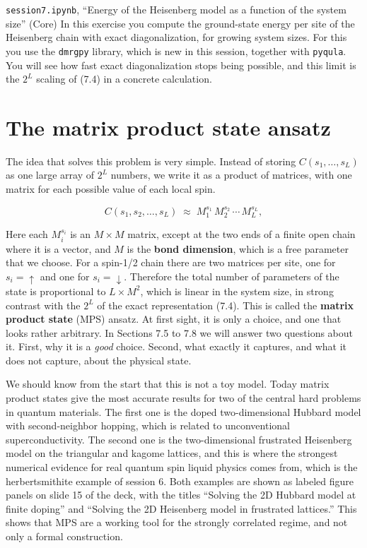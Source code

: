 \begin{notebookbox}{\texttt{session7.ipynb}, ``Energy of the Heisenberg model as a function of the system size'' (Core)}
In this exercise you compute the ground-state energy per site of the Heisenberg chain with exact
diagonalization, for growing system sizes. For this you use the \texttt{dmrgpy} library, which is new
in this session, together with
\texttt{pyqula}. You will see how fast exact diagonalization stops being possible, and this limit is
the $2^L$ scaling of (7.4) in a concrete calculation.
\end{notebookbox}

\section{The matrix product state ansatz}

The idea that solves this problem is very simple. Instead of storing $C(s_1,\dots,s_L)$ as one large
array of $2^L$ numbers, we write it as a product of matrices, with one matrix for each possible value
of each local spin.

\begin{equation}
C(s_1,s_2,\dots,s_L) \;\approx\; M^{s_1}_{1}\, M^{s_2}_{2}\, \cdots\, M^{s_L}_{L},
\end{equation}

Here each $M^{s_i}_i$ is an $M\times M$ matrix, except at the two ends of a finite open chain where it
is a vector, and $M$ is the \textbf{bond dimension}, which is a free parameter that we choose. For a
spin-1/2 chain there are two matrices per site, one for $s_i=\uparrow$ and one for
$s_i=\downarrow$. Therefore the total number of parameters of the state is proportional to $L\times
M^2$, which is linear in the system size, in strong contrast with the $2^L$ of the exact
representation (7.4). This is called the \textbf{matrix product state} (MPS) ansatz. At first sight,
it is only a choice, and one that looks rather arbitrary. In Sections 7.5 to 7.8 we will answer two
questions about it. First, why it is a \emph{good} choice. Second, what exactly it captures, and what it
does not capture, about the physical state.

We should know from the start that this is not a toy model. Today matrix product states give the most
accurate results for two of the central hard problems in quantum materials. The first one is the doped
two-dimensional Hubbard model with second-neighbor hopping, which is related to unconventional
superconductivity. The second one is the two-dimensional frustrated Heisenberg model on the triangular
and kagome lattices, and this is where the strongest numerical evidence for real quantum spin liquid
physics comes from, which is the herbertsmithite example of session 6. Both examples are shown as
labeled figure panels on slide 15 of the deck, with the titles ``Solving the 2D Hubbard model at
finite doping'' and ``Solving the 2D Heisenberg model in frustrated lattices.'' This shows that MPS
are a working tool for the strongly correlated regime, and not only a formal construction.

